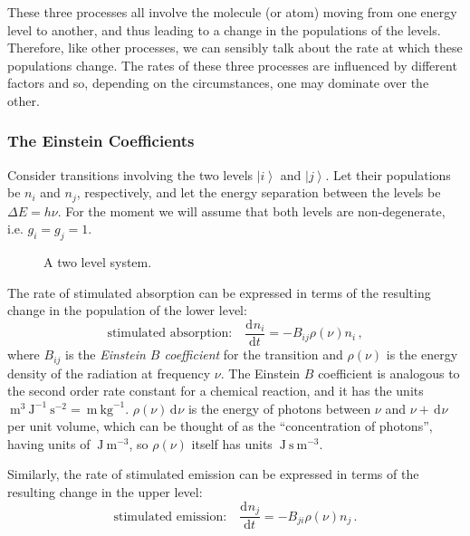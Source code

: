 \documentclass{article}
\theoremstyle{plain}\theoremheaderfont{\normalfont\itshape}\theorembodyfont{\rmfamily}\theoremseparator{.}\newtheorem*{rem}{Remark}\newtheorem*{ex}{Example}\newtheorem*{proof}{Proof}\newtheorem*{altp}{Alternative proof}
\theoremstyle{plain}\theoremheaderfont{\normalfont\bfseries}\theorembodyfont{\rmfamily}\theoremseparator{.}\newtheorem{thm}{Theorem}[section]\newtheorem{lem}[thm]{Lemma}\newtheorem{prop}[thm]{Proposition}\newtheorem*{cor}{Corollary}\newtheorem{defn}[thm]{Definition}\newtheorem{clm}[thm]{Claim}\newtheorem{clminproof}{Claim}\newtheorem{pos}{Postulate}[section]
\theoremstyle{break}\theoremheaderfont{\normalfont\itshape}\theorembodyfont{\rmfamily}\theoremseparator{.\medskip}\newtheorem*{proofskip}{Proof}\newtheorem*{exs}{Examples}\newtheorem*{rems}{Remarks}
\theoremstyle{break}\theoremheaderfont{\normalfont\bfseries}\theorembodyfont{\rmfamily}\theoremseparator{.\medskip}\newtheorem{lemskip}[thm]{Lemma}\newtheorem{defnskip}[thm]{Definition}\newtheorem{propskip}[thm]{Proposition}\newtheorem{thmskip}[thm]{Theorem}
\numberwithin{equation}{section}
\newcommand{\unit}[1]{\ \mathrm{#1}}
\renewcommand{\d}[2][]{\,\mathrm{d}^{#1} #2}
\newcommand{\dv}[3][]{\frac{\mathrm{d}^{#1} #2}{{\mathrm{d} #3}^{#1}}}
\newcommand{\ket}[1]{\left| #1 \right\rangle}
\begin{document}
    These three processes all involve the molecule (or atom) moving from one energy level to another, and thus leading to a change in the populations of the levels. Therefore, like other processes, we can sensibly talk about the rate at which these populations change. The rates of these three processes are influenced by different factors and so, depending on the circumstances, one may dominate over the other.

    \subsubsection{The Einstein Coefficients}
    Consider transitions involving the two levels \(\ket{i}\) and \(\ket{j}\). Let their populations be \(n_i\) and \(n_j\), respectively, and let the energy separation between the levels be \(\Delta E=h\nu\). For the moment we will assume that both levels are non-degenerate, i.e. \(g_i=g_j=1\).

    \begin{figure}
        \centering
        \caption{A two level system.}
    \end{figure}

    The rate of stimulated absorption can be expressed in terms of the resulting change in the population of the lower level:
    \begin{equation}
        \text{stimulated absorption:}\quad\dv{n_i}{t}=-B_{ij} \rho(\nu) n_i\,,
    \end{equation}
    where \(B_{ij}\) is the \textit{Einstein \(B\) coefficient} for the transition and \(\rho(\nu)\) is the energy density of the radiation at frequency \(\nu\). The Einstein \(B\) coefficient is analogous to the second order rate constant for a chemical reaction, and it has the units \(\!\unit{m}^3\unit{J}^{-1}\unit{s}^{-2}=\!\unit{m}\unit{kg}^{-1}\). \(\rho(\nu)\d{\nu}\) is the energy of photons between \(\nu\) and \(\nu+\d{\nu}\) per unit volume, which can be thought of as the ``concentration of photons'', having units of \(\!\unit{J}\unit{m}^{-3}\), so \(\rho(\nu)\) itself has units \(\!\unit{J}\unit{s}\unit{m}^{-3}\).

    Similarly, the rate of stimulated emission can be expressed in terms of the resulting change in the upper level:
    \begin{equation}
        \text{stimulated emission:}\quad\dv{n_j}{t}=-B_{ji} \rho(\nu) n_j\,.
    \end{equation}
\end{document}
